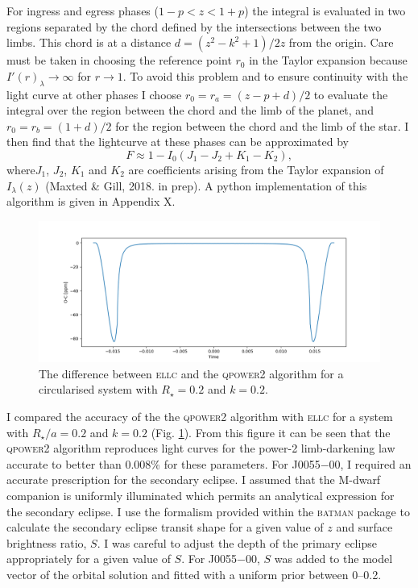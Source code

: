 For ingress and egress phases ($1 - p < z < 1 + p$) the integral is evaluated in two regions separated by the chord defined by the intersections between the two limbs. This
chord is at a distance $d = (z^2 - k^2 + 1) / 2z$ from the origin. Care must be taken in choosing the reference point $r_0$ in the Taylor expansion because $I'(r)_\lambda \rightarrow \infty $ for $r \rightarrow 1$. To avoid this problem and to ensure continuity with the light curve at other phases I choose $r_0 = r_a = (z - p + d)/2$ to evaluate the integral over the region between the chord and the limb of the planet, and $r_0 = r_b = (1 + d) / 2$ for the region between the chord and the limb of the star.  I then find that the lightcurve at these phases can be approximated by 
%
\begin{equation}
    F \approx 1 - I_0 ( J_1 - J_2 + K_1 - K_2),
\end{equation}
%
where$J_1$,  $J_2$,  $K_1$ and  $K_2$ are coefficients  arising from the Taylor expansion of $I_\lambda (z)$ (Maxted \& Gill, 2018. in prep). A python implementation of this algorithm is given in Appendix X.

\begin{landscape}
 \begin{figure}
  \centering
  \includegraphics[width=0.9\linewidth,keepaspectratio]{7-images/qpower_ellc_test.png}
  \caption{The difference between \textsc{ellc} and the \textsc{qpower2} algorithm for a circularised system with $R_\star = 0.2$ and $k=0.2$. }
  \label{method:fig:qpower2_ellc}
 \end{figure}
\end{landscape}

I compared the accuracy of the the \textsc{qpower2} algorithm with \textsc{ellc} for a system with $R_\star / a = 0.2$ and $k = 0.2$ (Fig. \ref{method:fig:qpower2_ellc}). From this figure it can be seen that the \textsc{qpower2} algorithm reproduces light curves for the power-2 limb-darkening law accurate to better than 0.008\% for these parameters. For J0055$-$00, I required an accurate prescription for the secondary eclipse. I assumed that the M-dwarf companion is uniformly illuminated which permits an analytical expression for the secondary eclipse. I use the formalism provided within the \textsc{batman} package to calculate the secondary eclipse transit shape for a given value of $z$ and surface brightness ratio, $S$. I was careful to adjust the depth of the primary eclipse appropriately for a given value of $S$. For J0055$-$00, $S$ was added to the model vector of the orbital solution and fitted with a uniform prior between 0--0.2.



